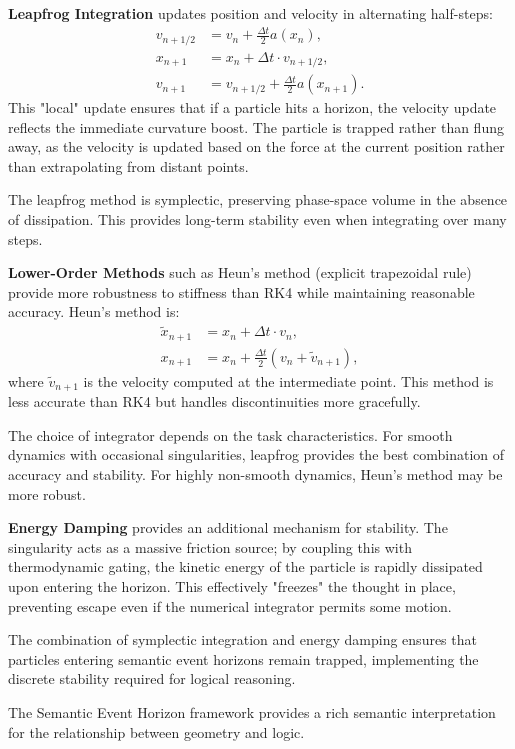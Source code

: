 \documentclass[12pt,letterpaper,twoside]{article}
\begin{document}
\textbf{Leapfrog Integration} updates position and velocity in alternating half-steps:
\begin{align}
v_{n+1/2} &= v_n + \frac{\Delta t}{2} a(x_n), \\
x_{n+1} &= x_n + \Delta t \cdot v_{n+1/2}, \\
v_{n+1} &= v_{n+1/2} + \frac{\Delta t}{2} a(x_{n+1}).
\end{align}
This "local" update ensures that if a particle hits a horizon, the velocity update reflects the immediate curvature boost. The particle is trapped rather than flung away, as the velocity is updated based on the force at the current position rather than extrapolating from distant points.

The leapfrog method is symplectic, preserving phase-space volume in the absence of dissipation. This provides long-term stability even when integrating over many steps.

\textbf{Lower-Order Methods} such as Heun's method (explicit trapezoidal rule) provide more robustness to stiffness than RK4 while maintaining reasonable accuracy. Heun's method is:
\begin{align}
\tilde{x}_{n+1} &= x_n + \Delta t \cdot v_n, \\
x_{n+1} &= x_n + \frac{\Delta t}{2} \left(v_n + \tilde{v}_{n+1}\right),
\end{align}
where $\tilde{v}_{n+1}$ is the velocity computed at the intermediate point. This method is less accurate than RK4 but handles discontinuities more gracefully.

The choice of integrator depends on the task characteristics. For smooth dynamics with occasional singularities, leapfrog provides the best combination of accuracy and stability. For highly non-smooth dynamics, Heun's method may be more robust.

\textbf{Energy Damping} provides an additional mechanism for stability. The singularity acts as a massive friction source; by coupling this with thermodynamic gating, the kinetic energy of the particle is rapidly dissipated upon entering the horizon. This effectively "freezes" the thought in place, preventing escape even if the numerical integrator permits some motion.

The combination of symplectic integration and energy damping ensures that particles entering semantic event horizons remain trapped, implementing the discrete stability required for logical reasoning.

The Semantic Event Horizon framework provides a rich semantic interpretation for the relationship between geometry and logic.
\end{document}
